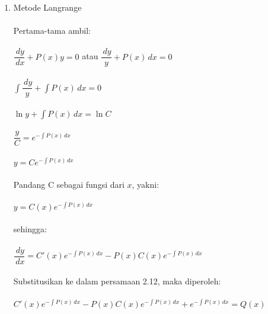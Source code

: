 \begin{enumerate}[1.]

	\item Metode Langrange \\ \\
	Pertama-tama ambil: \\ \\
	\begin{math} \dfrac{\, dy}{\, dx} + P(x)y = 0 \end{math} atau \begin{math} \dfrac{\, dy}{y} + P(x) \, dx = 0 \end{math} \\ \\
	\begin{math} \int \dfrac{\, dy}{y} + \int P(x) \, dx = 0 \end{math} \\ \\
	\begin{math} \ln y + \int P(x) \, dx = \ln C \end{math} \\ \\
	\begin{math} \dfrac{y}{C} = e^{- \int P(x) \, dx} \end{math} \\ \\
	\begin{math} y = Ce^{- \int P(x) \, dx} \end{math} \\ \\
	Pandang C sebagai fungsi dari \begin{math} x \end{math}, yakni: \\ \\
	\begin{math} y = C(x)e^{- \int P(x) \, dx} \end{math} \\ \\
	sehingga: \\ \\
	\begin{math} \dfrac{\, dy}{\, dx} = C'(x)e^{- \int P(x) \, dx} - P(x)C(x)e^{- \int P(x) \, dx} \end{math} \\ \\	
	Substitusikan ke dalam persamaan 2.12, maka diperoleh: \\ \\
	\begin{math} C'(x)e^{- \int P(x) \, dx} - P(x)C(x)e^{- \int P(x) \, dx} + e^{- \int P(x) \, dx} = Q(x) \end{math} \\ \\

\end{enumerate}
